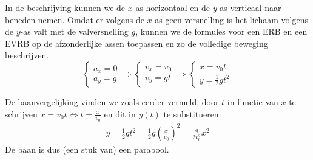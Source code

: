 \documentclass{ximera}
\begin{document}
\begin{image}[0.6\textwidth]
\end{image}

In de beschrijving kunnen we de $x$-as horizontaal en de $y$-as verticaal naar beneden nemen. Omdat er volgens de $x$-as geen versnelling is het lichaam volgens de $y$-as valt met de valversnelling $g$, kunnen we de formules voor een ERB en een EVRB op de afzonderlijke assen toepassen en zo de volledige beweging beschrijven.
\begin{equation*}
	\left\{
	\begin{array}{l}
	a_x=0\\
	a_y=g
	\end{array}
	\right.
	\Rightarrow
	\left\{
	\begin{array}{l}
	v_x=v_0\\
	v_y=gt
	\end{array}
	\right.
	\Rightarrow
	\left\{
	\begin{array}{l}
	x=v_0t\\
	y=\frac{1}{2}gt^2
	\end{array}
	\right.
\end{equation*}


De baanvergelijking vinden we zoals eerder vermeld, door $t$ in functie van $x$ te schrijven $x=v_0t\Leftrightarrow t=\frac{x}{v_0}$ en dit in $y(t)$ te substitueren:
\begin{eqnarray*}
	y=\frac{1}{2}gt^2=\frac{1}{2}g\left(\frac{x}{v_0}\right)^2=\frac{g}{2v_0^2}x^2
\end{eqnarray*}
De baan is dus (een stuk van) een parabool.
\end{document}
